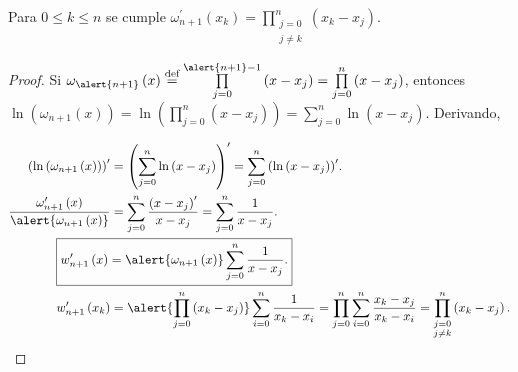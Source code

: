 \begin{frame}
	\begin{theorem}
		Para $0\leq k\leq n$ se cumple
		\begin{math}
			\omega^{\prime}_{n+1}
			\left(x_{k}\right)=
			\prod\limits_{\substack{j=0\\j\neq k}}^{n}
			\left(
			x_{k}-x_{j}
			\right).
		\end{math}
	\end{theorem}

	\begin{proof}
		Si
		\begin{math}
			\omega_{\alert{n+1}}
			\left(x\right)
			\overset{\text{def}}{=}
			\prod\limits_{j=0}^{\alert{n+1}-1}
			\left(
			x-x_{j}
			\right)=
			\prod\limits_{j=0}^{n}
			\left(
			x-x_{j}
			\right)
		\end{math}, entonces
		\begin{math}
			\ln
			\left(
			\omega_{n+1}
			\left(x\right)
			\right)=
			\ln
			\left(
			\prod\limits_{j=0}^{n}
			\left(
				x-x_{j}
				\right)
			\right)=
			\sum\limits_{j=0}^{n}
			\ln
			\left(
			x-x_{j}
			\right)
		\end{math}.
		Derivando,

		\begin{align*}
			{\left(
				\ln
				\left(
					\omega_{n+1}
					\left(x\right)
					\right)
			\right)}^{\prime} & =
			{\left(
			\sum\limits_{j=0}^{n}
			\ln
			\left(
				x-x_{j}
				\right)
			\right)}^{\prime}=
			\sum\limits_{j=0}^{n}
			{\left(
			\ln
			\left(
				x-x_{j}
				\right)
			\right)}^{\prime}.
			\\
			\dfrac{
				\omega^{\prime}_{n+1}\left(x\right)
			}{
				\alert{
					\omega_{n+1}\left(x\right)
				}
			}                 & =
			\sum\limits_{j=0}^{n}
			\dfrac{{\left(x-x_{j}\right)}^{\prime}}{x-x_{j}}=
			\sum\limits_{j=0}^{n}
			\dfrac{1}{x-x_{j}}.
			\\
			\Aboxed{
			w^{\prime}_{n+1}
			\left(x\right)    & =
			\alert{
				\omega_{n+1}
				\left(x\right)
			}
			\sum\limits_{j=0}^{n}
			\dfrac{1}{x-x_{j}}.
			}
			\\
			w^{\prime}_{n+1}
			\left(x_{k}\right)
			                  & =
			\alert{
				\prod\limits_{j=0}^{n}
				\left(
				x_{k}-x_{j}
				\right)
			}
			\sum\limits_{i=0}^{n}
			\dfrac{1}{x_{k}-x_{i}}=
			\prod\limits_{j=0}^{n}
			\sum\limits_{i=0}^{n}
			\dfrac{
			x_{k}-x_{j}
			}{
			x_{k}-x_{i}
			}
			=
			\prod\limits_{\substack{j=0 \\j\neq k}}^{n}
			\left(
			x_{k}-x_{j}
			\right).
		\end{align*}
	\end{proof}
\end{frame}

